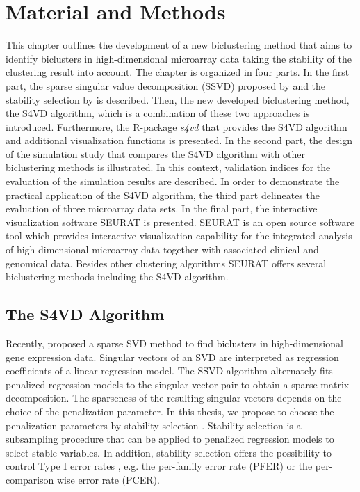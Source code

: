 \chapter{Material and Methods}
This chapter outlines the development of a new biclustering method that aims to identify biclusters in high-dimensional microarray data taking the stability of the  clustering result into account. The chapter is organized in four parts. In the first part, the sparse singular value decomposition (SSVD) proposed by \citet{Lee2010} and the stability selection by \citet{Meinshausen2010} is described. Then, the new developed biclustering method, the S4VD algorithm, which is a combination of these two approaches is introduced. Furthermore, the R-package \textit{s4vd} that provides the S4VD algorithm and additional visualization functions is presented. In the second part, the design of the simulation study that compares the S4VD algorithm with other biclustering methods is illustrated. In this context, validation indices for the evaluation of the simulation results are described. In order to demonstrate the practical application of the S4VD algorithm, the third part delineates the evaluation of three microarray data sets. In the final part, the interactive visualization software SEURAT \cite{Gribov2010} is presented. SEURAT is an open source software tool which provides interactive visualization capability for the integrated analysis of high-dimensional microarray data together with associated clinical and genomical data. Besides other clustering algorithms SEURAT offers several biclustering methods including the S4VD algorithm.

\section{The S4VD Algorithm}
Recently, \citet{Lee2010} proposed a sparse SVD method to find biclusters in high-dimensional gene expression data. Singular vectors of an SVD are interpreted as regression coefficients of a linear regression model. The SSVD algorithm alternately fits penalized regression models to the singular vector pair to obtain a sparse matrix decomposition. The sparseness of the resulting singular vectors depends on the choice of the penalization parameter. In this thesis, we propose to choose the penalization parameters by stability selection \cite{Meinshausen2010}. Stability selection is a subsampling procedure that can be applied to penalized regression models to select stable variables. In addition, stability selection offers the possibility to control Type I error rates \cite{Dudoit2003}, e.g. the per-family error rate (PFER) or the per-comparison wise error rate (PCER). 

